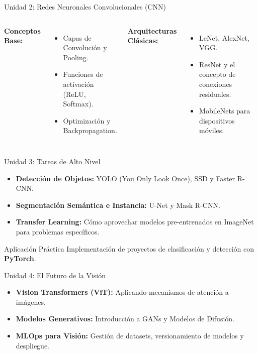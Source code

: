 \documentclass[10pt]{beamer}
\begin{document}
\begin{frame}{Unidad 2: Redes Neuronales Convolucionales (CNN)}
    \begin{columns}[T]
        \textbf{Conceptos Base:}
        \begin{itemize}
            \item Capas de Convolución y Pooling.
            \item Funciones de activación (ReLU, Softmax).
            \item Optimización y Backpropagation.
        \end{itemize}
        \textbf{Arquitecturas Clásicas:}
        \begin{itemize}
            \item LeNet, AlexNet, VGG.
            \item ResNet y el concepto de conexiones residuales.
            \item MobileNets para dispositivos móviles.
        \end{itemize}
    \end{columns}
\end{frame}

\begin{frame}{Unidad 3: Tareas de Alto Nivel}
    \begin{itemize}
        \item \textbf{Detección de Objetos:} YOLO (You Only Look Once), SSD y Faster R-CNN.
        \item \textbf{Segmentación Semántica e Instancia:} U-Net y Mask R-CNN.
        \item \textbf{Transfer Learning:} Cómo aprovechar modelos pre-entrenados en ImageNet para problemas específicos.
    \end{itemize}
    \vspace{0.3cm}
    \begin{alertblock}{Aplicación Práctica}
        Implementación de proyectos de clasificación y detección con \textbf{PyTorch}.
    \end{alertblock}
\end{frame}

\begin{frame}{Unidad 4: El Futuro de la Visión}
    \begin{itemize}
        \item \textbf{Vision Transformers (ViT):} Aplicando mecanismos de atención a imágenes.
        \item \textbf{Modelos Generativos:} Introducción a GANs y Modelos de Difusión.
        \item \textbf{MLOps para Visión:} Gestión de datasets, versionamiento de modelos y despliegue.
    \end{itemize}
\end{frame}
\end{document}
